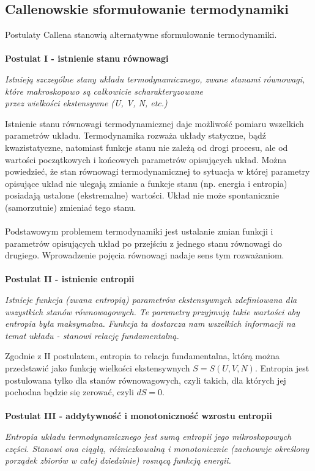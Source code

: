\documentclass[12pt,a4paper,openright]{report} %
\begin{document}
\subsection{Callenowskie sformułowanie termodynamiki} 
Postulaty Callena stanowią alternatywne sformułowanie termodynamiki.\\
\\
\textbf{Postulat I - istnienie stanu równowagi}
%
\begin{center}
\textit{Istnieją szczególne stany układu termodynamicznego, zwane stanami równowagi, które makroskopowo są całkowicie scharakteryzowane \\ przez wielkości ekstensywne (U, V, N, etc.)}
\end{center}
%
Istnienie stanu równowagi termodynamicznej daje możliwość pomiaru wszelkich parametrów układu. Termodynamika rozważa układy statyczne, bądź kwazistatyczne, natomiast funkcje stanu nie zależą od drogi procesu, ale od wartości początkowych i końcowych parametrów opisujących układ. Można powiedzieć, że stan równowagi termodynamicznej to sytuacja w której parametry opisujące układ nie ulegają zmianie a funkcje stanu (np. energia i entropia) posiadają ustalone (ekstremalne) wartości. Układ nie może spontanicznie (samorzutnie) zmieniać tego stanu.\\
\\
Podstawowym problemem termodynamiki jest ustalanie zmian funkcji i parametrów opisujących układ po przejściu z jednego stanu równowagi do drugiego. Wprowadzenie pojęcia równowagi nadaje sens tym rozważaniom.\\
\\
\textbf{Postulat II - istnienie entropii}
%
\begin{center}
\textit{Istnieje funkcja (zwana entropią) parametrów ekstensywnych zdefiniowana dla wszystkich stanów równowagowych. Te parametry przyjmują takie wartości aby entropia była maksymalna. Funkcja ta dostarcza nam wszelkich informacji na temat układu - stanowi relację fundamentalną.}
\end{center}
%
Zgodnie z II postulatem, entropia to relacja fundamentalna, którą można przedstawić jako funkcję wielkości ekstensywnych $S=S(U,V,N)$. Entropia jest postulowana tylko dla stanów równowagowych, czyli takich, dla których jej pochodna będzie się zerować, czyli $dS=0$.\\
\\
\textbf{Postulat III - addytywność i monotoniczność wzrostu entropii}
\begin{center}
\textit{Entropia układu termodynamicznego jest sumą entropii jego mikroskopowych części. Stanowi ona ciągłą, różniczkowalną i monotonicznie (zachowuje określony porządek zbiorów w całej dziedzinie) rosnącą  funkcją energii.}
\end{center}
\end{document}
